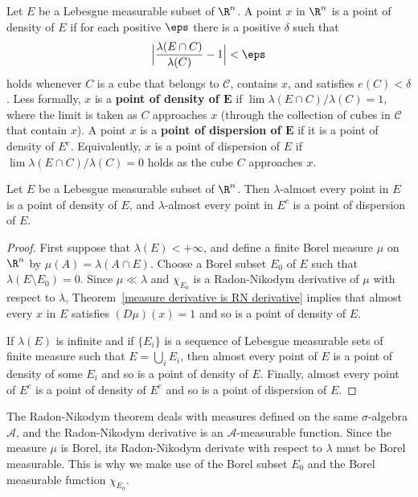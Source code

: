 Let $E$ be a Lebesgue measurable subset of $\R^n$. A point $x$ in $\R^n$ is a point of density of $E$ if for each positive $\eps$ there is a positive $\delta$ such that
\[\Big|\frac{\lambda(E\cap C)}{\lambda(C)}-1\Big|<\eps\]
holds whenever $C$ is a cube that belongs to $\mathcal{C}$, contains $x$, and satisfies $e(C)<\delta$. Less formally, $x$ is a \textbf{point of density of $\bm{E}$} if $\lim\lambda(E\cap C)/\lambda(C)=1$, where the limit is taken as $C$ approaches $x$ (through the collection of cubes in $\mathcal{C}$ that contain $x$). A point $x$ is a \textbf{point of dispersion of $\bm{E}$} if it is a point of density of $E^c$. Equivalently, $x$ is a point of dispersion of $E$ if $\lim\lambda(E\cap C)/\lambda(C)=0$ holds as the cube $C$ approaches $x$.
\begin{proposition}\label{Lebesgue density of set}
Let $E$ be a Lebesgue measurable subset of $\R^n$. Then $\lambda$-almost every point in $E$ is a point of density of $E$, and $\lambda$-almost every point in $E^c$ is a point of dispersion of $E$.
\end{proposition}
\begin{proof}
First suppose that $\lambda(E)<+\infty$, and define a finite Borel measure $\mu$ on $\R^n$ by $\mu(A)=\lambda(A\cap E)$. Choose a Borel subset $E_0$ of $E$ such that $\lambda(E\setminus E_0)=0$. Since $\mu\ll\lambda$ and $\chi_{E_0}$ is a Radon-Nikodym derivative of $\mu$ with respect to $\lambda$, Theorem~\ref{measure derivative is RN derivative} implies that almost every $x$ in $E$ satisfies $(D\mu)(x)=1$ and so is a point of density of $E$.\par
If $\lambda(E)$ is infinite and if $\{E_i\}$ is a sequence of Lebesgue measurable sets of finite measure such that $E=\bigcup_iE_i$, then almost every point of $E$ is a point of density of some $E_i$ and so is a point of density of $E$. Finally, almost every point of $E^c$ is a point of density of $E^c$ and so is a point of dispersion of $E$.
\end{proof}
\begin{remark}
The Radon-Nikodym theorem deals with measures defined on the same $\sigma$-algebra $\mathcal{A}$, and the Radon-Nikodym derivative is an $\mathcal{A}$-measurable function. Since the measure $\mu$ is Borel, its Radon-Nikodym derivate with respect to $\lambda$ must be Borel measurable. This is why we make use of the Borel subset $E_0$ and the Borel measurable function $\chi_{E_0}$.
\end{remark}
